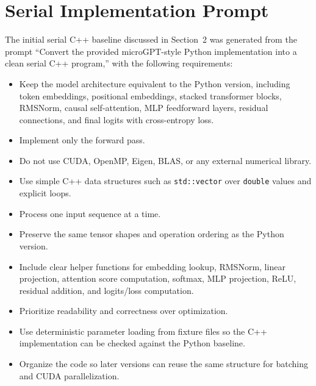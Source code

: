 \section{Serial Implementation Prompt}
\label{appendix:serial-prompt}
The initial serial C++ baseline discussed in Section~2 was generated from the prompt ``Convert the provided microGPT-style Python implementation into a clean serial C++ program,'' with the following requirements:
\begin{itemize}[noitemsep, topsep=0pt]
    \item Keep the model architecture equivalent to the Python version, including token embeddings, positional embeddings, stacked transformer blocks, RMSNorm, causal self-attention, MLP feedforward layers, residual connections, and final logits with cross-entropy loss.
    \item Implement only the forward pass.
    \item Do not use CUDA, OpenMP, Eigen, BLAS, or any external numerical library.
    \item Use simple C++ data structures such as \texttt{std::vector} over \texttt{double} values and explicit loops.
    \item Process one input sequence at a time.
    \item Preserve the same tensor shapes and operation ordering as the Python version.
    \item Include clear helper functions for embedding lookup, RMSNorm, linear projection, attention score computation, softmax, MLP projection, ReLU, residual addition, and logits/loss computation.
    \item Prioritize readability and correctness over optimization.
    \item Use deterministic parameter loading from fixture files so the C++ implementation can be checked against the Python baseline.
    \item Organize the code so later versions can reuse the same structure for batching and CUDA parallelization.
\end{itemize}

